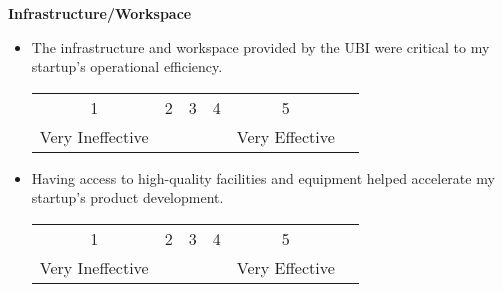 \documentclass[../Main.tex]{subfiles}%
\begin{document}
	\textbf{Infrastructure/Workspace}
	\begin{itemize}
		\item The infrastructure and workspace provided by the UBI were critical to my startup's operational efficiency.
		\begin{center}
		\begin{tabular}{cccccc}
		1 & 2 & 3 & 4 & 5 \\
		Very Ineffective & & & & Very Effective
		\end{tabular}
		\end{center}
		\item Having access to high-quality facilities and equipment helped accelerate my startup's product development.
		\begin{center}
		\begin{tabular}{cccccc}
		1 & 2 & 3 & 4 & 5 \\
		Very Ineffective & & & & Very Effective
		\end{tabular}
		\end{center}
	\end{itemize}
	
\end{document}
